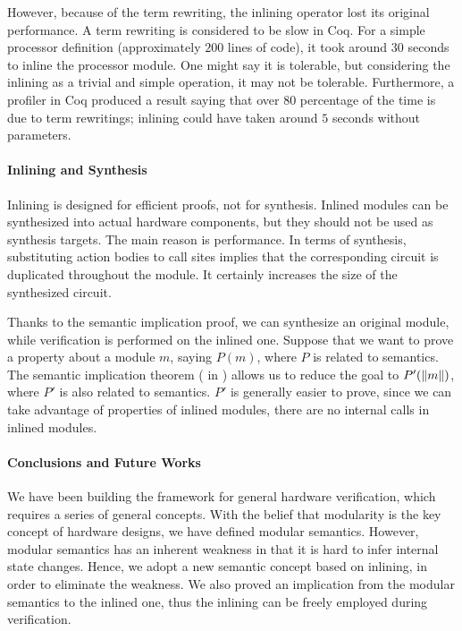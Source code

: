 However, because of the term rewriting, the inlining operator lost its
original performance. A term rewriting is considered to be slow in
Coq. For a simple processor definition (approximately $200$ lines of
code), it took around $30$ seconds to inline the processor module. One
might say it is tolerable, but considering the inlining as a trivial
and simple operation, it may not be tolerable. Furthermore, a profiler
in Coq produced a result saying that over $80$ percentage of the time
is due to term rewritings; inlining could have taken around $5$
seconds without parameters.

\paragraph{Inlining and Synthesis}

Inlining is designed for efficient proofs, not for synthesis. Inlined
modules can be synthesized into actual hardware components, but they
should not be used as synthesis targets. The main reason is
performance. In terms of synthesis, substituting action bodies to call
sites implies that the corresponding circuit is duplicated throughout
the module. It certainly increases the size of the synthesized
circuit.

Thanks to the semantic implication proof, we can synthesize an
original module, while verification is performed on the inlined
one. Suppose that we want to prove a property about a module $m$,
saying $P(m)$, where $P$ is related to semantics. The semantic
implication theorem ( in
) allows us to reduce the goal to
$P'(\| m \|)$, where $P'$ is also related to semantics. $P'$ is
generally easier to prove, since we can take advantage of properties
of inlined modules, \eg{} there are no internal calls in inlined
modules.

\paragraph{Conclusions and Future Works}

We have been building the \Kami{} framework for general hardware
verification, which requires a series of general concepts. With the
belief that modularity is the key concept of hardware designs, we have
defined modular semantics. However, modular semantics has an inherent
weakness in that it is hard to infer internal state changes. Hence, we
adopt a new semantic concept based on inlining, in order to eliminate
the weakness. We also proved an implication from the modular semantics
to the inlined one, thus the inlining can be freely employed during
verification.

